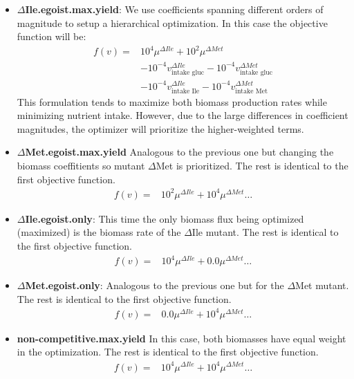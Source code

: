 \documentclass[11pt, letterpaper]{article}
\begin{document}
\begin{itemize}

  \item \textbf{$\Delta$Ile.egoist.max.yield}:
  We use coefficients spanning different orders of magnitude to setup a hierarchical optimization. In this case the objective function will be:
  \begin{align*} 
    f(v) = & 
    10^{4} \mu^{\Delta Ile} + 10^{2} \mu^{\Delta Met} \\
    & - 10^{-4} v^{\Delta Ile}_{\text{intake gluc}} - 10^{-4} v^{\Delta Met}_{\text{intake gluc}} \\
    & - 10^{-4} v^{\Delta Ile}_{\text{intake Ile}} - 10^{-4} v^{\Delta Met}_{\text{intake Met}}
  \end{align*} 
  This formulation tends to maximize both biomass production rates while minimizing nutrient intake. 
  However, due to the large differences in coefficient magnitudes, the optimizer will prioritize the higher-weighted terms.
  
  \item \textbf{$\Delta$Met.egoist.max.yield}
  Analogous to the previous one but changing the biomass coeffitients so mutant $\Delta$Met is prioritized. 
  The rest is identical to the first objective function.
  \begin{align*} 
    f(v) = & 
    10^{2} \mu^{\Delta Ile} + 10^{4} \mu^{\Delta Met} \dots
  \end{align*} 

  \item \textbf{$\Delta$Ile.egoist.only}:
  This time the only biomass flux being optimized (maximized) is the biomass rate of the $\Delta$Ile mutant. 
  The rest is identical to the first objective function.
  \begin{align*} 
    f(v) = & 
    10^{4} \mu^{\Delta Ile} + 0.0 \mu^{\Delta Met} \dots
  \end{align*} 
  
  \item \textbf{$\Delta$Met.egoist.only}:
  Analogous to the previous one but for the $\Delta$Met mutant.
  The rest is identical to the first objective function.
  \begin{align*} 
    f(v) = & 
    0.0 \mu^{\Delta Ile} + 10^{4} \mu^{\Delta Met} \dots
  \end{align*} 

  \item \textbf{non-competitive.max.yield}
  In this case, both biomasses have equal weight in the optimization.
  The rest is identical to the first objective function.
  \begin{align*} 
    f(v) = & 
    10^{4} \mu^{\Delta Ile} + 10^{4} \mu^{\Delta Met} \dots
  \end{align*} 

\end{itemize}
\end{document}

